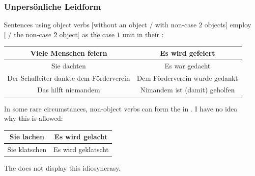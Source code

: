 \subsubsection{Unpersönliche Leidform}
Sentences using object verbs [without an object / with non-case $2$ objects] employ [ / the non-case $2$ object] as  the  case $1$ unit in their :\begin{example}\begin{tabular}{c|c}
    Viele Menschen feiern & Es wird gefeiert\\\hline Sie dachten & Es war gedacht \\\hline Der Schulleiter dankte dem Förderverein & Dem Förderverein wurde gedankt\\\hline Das hilft niemandem & Nimandem ist (damit) geholfen
\end{tabular}\end{example}
In some rare circumstances, non-object verbs can form the  in . I have no idea why this is allowed:
\begin{example}\begin{tabular}{c|c}
        Sie lachen & Es wird gelacht\\\hline Sie klatschen & Es wird geklatscht
\end{tabular}\end{example}
The  does not display this idiosyncrasy.

